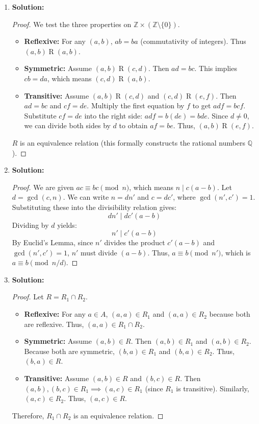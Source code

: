 \documentclass[11pt, a4paper]{article}
\theoremstyle{definition}
\theoremstyle{remark}
\newcommand{\Z}{\mathbb{Z}}
\newcommand{\Q}{\mathbb{Q}}
\begin{document}
\begin{enumerate}[label=\textbf{\arabic*.}]
    \item \textbf{Solution:}
    \begin{proof}
    We test the three properties on $\Z \times (\Z \setminus \{0\})$.
    \begin{itemize}
        \item \textbf{Reflexive:} For any $(a,b)$, $ab = ba$ (commutativity of integers). Thus $(a,b) \mathrel{R} (a,b)$.
        \item \textbf{Symmetric:} Assume $(a,b) \mathrel{R} (c,d)$. Then $ad = bc$. This implies $cb = da$, which means $(c,d) \mathrel{R} (a,b)$.
        \item \textbf{Transitive:} Assume $(a,b) \mathrel{R} (c,d)$ and $(c,d) \mathrel{R} (e,f)$. Then $ad = bc$ and $cf = de$. Multiply the first equation by $f$ to get $adf = bcf$. Substitute $cf = de$ into the right side: $adf = b(de) = bde$. Since $d \neq 0$, we can divide both sides by $d$ to obtain $af = be$. Thus, $(a,b) \mathrel{R} (e,f)$.
    \end{itemize}
    $R$ is an equivalence relation (this formally constructs the rational numbers $\Q$).
    \end{proof}

    \item \textbf{Solution:}
    \begin{proof}
    We are given $ac \equiv bc \pmod{n}$, which means $n \mid c(a - b)$. Let $d = \gcd(c,n)$. We can write $n = d n'$ and $c = d c'$, where $\gcd(n', c') = 1$. 
    Substituting these into the divisibility relation gives:
    \[ d n' \mid d c' (a - b) \]
    Dividing by $d$ yields:
    \[ n' \mid c' (a - b) \]
    By Euclid's Lemma, since $n'$ divides the product $c'(a-b)$ and $\gcd(n', c') = 1$, $n'$ must divide $(a - b)$. 
    Thus, $a \equiv b \pmod{n'}$, which is $a \equiv b \pmod{n/d}$.
    \end{proof}

    \item \textbf{Solution:}
    \begin{proof}
    Let $R = R_1 \cap R_2$.
    \begin{itemize}
        \item \textbf{Reflexive:} For any $a \in A$, $(a,a) \in R_1$ and $(a,a) \in R_2$ because both are reflexive. Thus, $(a,a) \in R_1 \cap R_2$.
        \item \textbf{Symmetric:} Assume $(a,b) \in R$. Then $(a,b) \in R_1$ and $(a,b) \in R_2$. Because both are symmetric, $(b,a) \in R_1$ and $(b,a) \in R_2$. Thus, $(b,a) \in R$.
        \item \textbf{Transitive:} Assume $(a,b) \in R$ and $(b,c) \in R$. Then $(a,b), (b,c) \in R_1 \implies (a,c) \in R_1$ (since $R_1$ is transitive). Similarly, $(a,c) \in R_2$. Thus, $(a,c) \in R$.
    \end{itemize}
    Therefore, $R_1 \cap R_2$ is an equivalence relation.
    \end{proof}


\end{enumerate}
\end{document}
